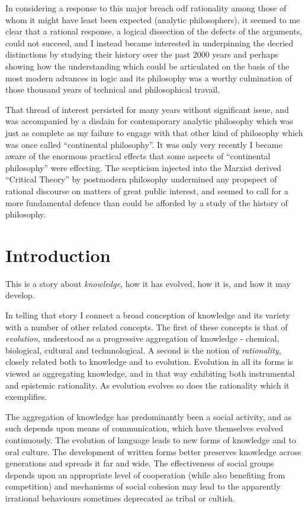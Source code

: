 \documentclass[10pt,titlepage]{book}
\begin{document}
In considering a response to this major breach odf rationality among those of whom it might have least been expected (analytic philosophers), it seemed to me clear that a rational response, a logical dissection of the defects of the arguments, could not succeed, and I instead became interested in underpinning the decried distinctions by studying their history over the past 2000 years and perhaps showing how the understanding which could be articulated on the basis of the most modern advances in logic and its philosophy was a worthy culmination of those thousand years of technical and philosophical travail.

That thread of interest persisted for many years without significant issue, and was accompanied by a disdain for contemporary analytic philosophy which was just as complete as my failure to engage with that other kind of philosophy which was once called ``continental philosophy''.
It was only very recently I became aware of the enormous practical effects that some aspects of ``continental philosophy'' were effecting.
The scepticism injected into the Marxist derived ``Critical Theory'' by postmodern philosophy undermined any propspect of rational discourse on matters of great public interest, and seemed to call for a more fundamental defence than could be afforded by a study of the history of philosophy.


\chapter{Introduction}

This is a story about \emph{knowledge}, how it has evolved, how it is, and how it may develop.

In telling that story I connect a broad conception of knowledge and its variety with a number of other related concepts.
The first of these concepts is that of \emph{evolution}, understood as a progressive aggregation of knowledge -  chemical, biological, cultural and technnological.
A second is the notion of \emph{rationality}, closely related both to knowledge and to evolution.
Evolution in all its forms is viewed as aggregating knowledge, and in that way exhibiting both instrumental and epistemic rationality.
As evolution evolves so does the rationality which it exemplifies.

The aggregation of knowledge has predominantly been a social activity, and as such depends upon means of communication, which have themselves evolved continuously.
The evolution of language leads to new forms of knowledge and to oral culture.
The development of written forms better preserves knowledge across generations and spreads it far and wide.
The effectiveness of social groups depends upon an appropriate level of cooperation (while also benefiting from competition) and mechanisms of social cohesion may lead to the apparently irrational behaviours sometimes deprecated as tribal or cultish.
\end{document}
